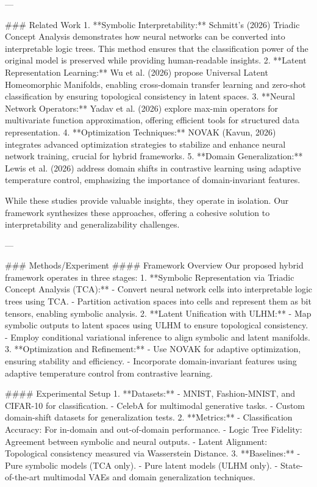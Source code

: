 ---

### Related Work
1. **Symbolic Interpretability:** Schmitt's (2026) Triadic Concept Analysis demonstrates how neural networks can be converted into interpretable logic trees. This method ensures that the classification power of the original model is preserved while providing human-readable insights.
2. **Latent Representation Learning:** Wu et al. (2026) propose Universal Latent Homeomorphic Manifolds, enabling cross-domain transfer learning and zero-shot classification by ensuring topological consistency in latent spaces.
3. **Neural Network Operators:** Yadav et al. (2026) explore max-min operators for multivariate function approximation, offering efficient tools for structured data representation.
4. **Optimization Techniques:** NOVAK (Kavun, 2026) integrates advanced optimization strategies to stabilize and enhance neural network training, crucial for hybrid frameworks.
5. **Domain Generalization:** Lewis et al. (2026) address domain shifts in contrastive learning using adaptive temperature control, emphasizing the importance of domain-invariant features.

While these studies provide valuable insights, they operate in isolation. Our framework synthesizes these approaches, offering a cohesive solution to interpretability and generalizability challenges.

---

### Methods/Experiment
#### Framework Overview
Our proposed hybrid framework operates in three stages:
1. **Symbolic Representation via Triadic Concept Analysis (TCA):**
   - Convert neural network cells into interpretable logic trees using TCA.
   - Partition activation spaces into cells and represent them as bit tensors, enabling symbolic analysis.
2. **Latent Unification with ULHM:**
   - Map symbolic outputs to latent spaces using ULHM to ensure topological consistency.
   - Employ conditional variational inference to align symbolic and latent manifolds.
3. **Optimization and Refinement:**
   - Use NOVAK for adaptive optimization, ensuring stability and efficiency.
   - Incorporate domain-invariant features using adaptive temperature control from contrastive learning.

#### Experimental Setup
1. **Datasets:**
   - MNIST, Fashion-MNIST, and CIFAR-10 for classification.
   - CelebA for multimodal generative tasks.
   - Custom domain-shift datasets for generalization tests.
2. **Metrics:**
   - Classification Accuracy: For in-domain and out-of-domain performance.
   - Logic Tree Fidelity: Agreement between symbolic and neural outputs.
   - Latent Alignment: Topological consistency measured via Wasserstein Distance.
3. **Baselines:**
   - Pure symbolic models (TCA only).
   - Pure latent models (ULHM only).
   - State-of-the-art multimodal VAEs and domain generalization techniques.

